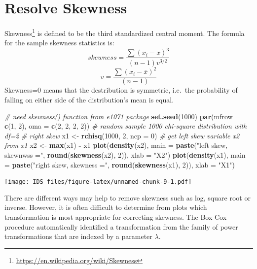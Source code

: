 \documentclass[12pt,]{krantz}
\makeatletter
\newenvironment{Shaded}{\begin{snugshade}}{\end{snugshade}}
\newcommand{\CommentTok}[1]{\textcolor[rgb]{0.37,0.37,0.37}{\textit{#1}}}
\newcommand{\DataTypeTok}[1]{\textcolor[rgb]{0.27,0.27,0.27}{#1}}
\newcommand{\DecValTok}[1]{\textcolor[rgb]{0.06,0.06,0.06}{#1}}
\newcommand{\KeywordTok}[1]{\textcolor[rgb]{0.27,0.27,0.27}{\textbf{#1}}}
\newcommand{\NormalTok}[1]{#1}
\newcommand{\OperatorTok}[1]{\textcolor[rgb]{0.43,0.43,0.43}{\textbf{#1}}}
\newcommand{\StringTok}[1]{\textcolor[rgb]{0.5,0.5,0.5}{#1}}
\renewcommand{\href}[2]{#2\footnote{\url{#1}}}
\newenvironment{kframe}{%
\medskip{}
\setlength{\fboxsep}{.8em}
 \def\at@end@of@kframe{}%
 \ifinner\ifhmode%
  \def\at@end@of@kframe{\end{minipage}}%
  \begin{minipage}{\columnwidth}%
 \fi\fi%
 \def\FrameCommand##1{\hskip\@totalleftmargin \hskip-\fboxsep
 \colorbox{shadecolor}{##1}\hskip-\fboxsep
     \hskip-\linewidth \hskip-\@totalleftmargin \hskip\columnwidth}%
 \MakeFramed {\advance\hsize-\width
   \@totalleftmargin\z@ \linewidth\hsize
   \@setminipage}}%
 {\par\unskip\endMakeFramed%
 \at@end@of@kframe}
\renewenvironment{Shaded}{\begin{kframe}}{\end{kframe}}
\makeatother
\begin{document}
\hypertarget{resolve-skewness}{%
\section{Resolve Skewness}\label{resolve-skewness}}

\href{https://en.wikipedia.org/wiki/Skewness}{Skewness} is defined to be the third standardized central moment. The formula for the sample skewness statistics is:
\[ skewness=\frac{\sum(x_{i}-\bar{x})^{3}}{(n-1)v^{3/2}}\]
\[v=\frac{\sum(x_{i}-\bar{x})^{2}}{(n-1)}\]
Skewness=0 means that the destribution is symmetric, i.e.~the probability of falling on either side of the distribution's mean is equal.

\begin{Shaded}
\begin{Highlighting}[]
\CommentTok{# need skewness() function from e1071 package}
\KeywordTok{set.seed}\NormalTok{(}\DecValTok{1000}\NormalTok{)}
\KeywordTok{par}\NormalTok{(}\DataTypeTok{mfrow =} \KeywordTok{c}\NormalTok{(}\DecValTok{1}\NormalTok{, }\DecValTok{2}\NormalTok{), }\DataTypeTok{oma =} \KeywordTok{c}\NormalTok{(}\DecValTok{2}\NormalTok{, }\DecValTok{2}\NormalTok{, }\DecValTok{2}\NormalTok{, }\DecValTok{2}\NormalTok{))}
\CommentTok{# random sample 1000 chi-square distribution with df=2}
\CommentTok{# right skew}
\NormalTok{x1 <-}\StringTok{ }\KeywordTok{rchisq}\NormalTok{(}\DecValTok{1000}\NormalTok{, }\DecValTok{2}\NormalTok{, }\DataTypeTok{ncp =} \DecValTok{0}\NormalTok{)}
\CommentTok{# get left skew variable x2 from x1}
\NormalTok{x2 <-}\StringTok{ }\KeywordTok{max}\NormalTok{(x1) }\OperatorTok{-}\StringTok{ }\NormalTok{x1}
\KeywordTok{plot}\NormalTok{(}\KeywordTok{density}\NormalTok{(x2), }\DataTypeTok{main =} \KeywordTok{paste}\NormalTok{(}\StringTok{"left skew, skewnwss ="}\NormalTok{, }
    \KeywordTok{round}\NormalTok{(}\KeywordTok{skewness}\NormalTok{(x2), }\DecValTok{2}\NormalTok{)), }\DataTypeTok{xlab =} \StringTok{"X2"}\NormalTok{)}
\KeywordTok{plot}\NormalTok{(}\KeywordTok{density}\NormalTok{(x1), }\DataTypeTok{main =} \KeywordTok{paste}\NormalTok{(}\StringTok{"right skew, skewness ="}\NormalTok{, }
    \KeywordTok{round}\NormalTok{(}\KeywordTok{skewness}\NormalTok{(x1), }\DecValTok{2}\NormalTok{)), }\DataTypeTok{xlab =} \StringTok{"X1"}\NormalTok{)}
\end{Highlighting}
\end{Shaded}

\texttt{[image: IDS\_files/figure-latex/unnamed-chunk-9-1.pdf]}

There are different ways may help to remove skewness such as log, square root or inverse. However, it is often difficult to determine from plots which transformation is most appropriate for correcting skewness. The Box-Cox procedure automatically identified a transformation from the family of power transformations that are indexed by a parameter \(\lambda\)\citep{BOXCOX1}.
\end{document}
